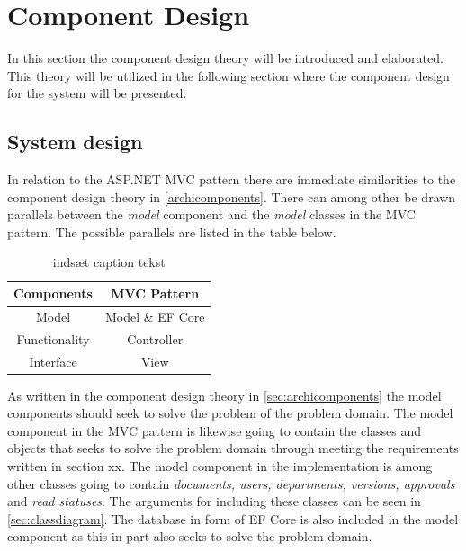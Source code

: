 \section{Component Design} \label{sec:componentdesign}

In this section the component design theory will be introduced and elaborated.
This theory will be utilized in the following section where the component design for the system will be presented.



\subsection{System design} \label{sec:systemdesign}

In relation to the ASP.NET MVC pattern there are immediate similarities to the component design theory in \cref{archicomponents}.
There can among other be drawn parallels between the \textit{model} component and the \textit{model} classes in the MVC pattern.
The possible parallels are listed in the table below.

\begin{table}
	\centering
	\begin{tabular}{| c | c | }
	\hline
	\textbf{Components} & \textbf{MVC Pattern} \\
	\hline
	Model & Model \& EF Core \\
	\hline
	Functionality & Controller \\
	\hline
	Interface & View \\
	\hline
\end{tabular}
\caption{{\color{red}indsæt caption tekst}}\label{tab:PatternParallels}
\end{table}

As written in the component design theory in \cref{sec:archicomponents} the model components should seek to solve the problem of the problem domain.
The model component in the MVC pattern is likewise going to contain the classes and objects that seeks to solve the problem domain through meeting the requirements written in {\color{red}section xx}.
The model component in the implementation is among other classes going to contain \textit{documents, users, departments, versions, approvals} and \textit{read statuses}.
The arguments for including these classes can be seen in \cref{sec:classdiagram}.
The database in form of EF Core is also included in the model component as this in part also seeks to solve the problem domain.

